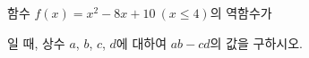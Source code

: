 함수 $f(x)=x^2-8x+10\ (x\le 4)$의 역함수가\par\smallskip{}\par\smallskip\noindent 일 때, 상수 $a$, $b$, $c$, $d$에 대하여 $ab-cd$의 값을 구하시오.
